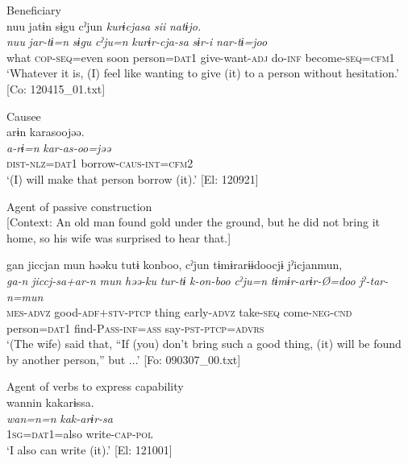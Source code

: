 \ea\label{ex:6-55}
\ea Beneficiary\\
{\TM}
\glll  nuu  jatɨn  sɨgu  cˀjun  \textit{kurɨcjasa}  \textit{sii}  \textit{natɨjo.}\\
\textit{nuu}  \textit{jar-tɨ=n}  \textit{sɨgu}  \textit{cˀju=n}  \textit{kurɨr-cja-sa}      \textit{sɨr-i}  \textit{nar-tɨ=joo}\\
what  \textsc{cop}-\textsc{seq}=even  soon  person=\textsc{dat}1  give-want-\textsc{adj}   do-\textsc{inf}  become-\textsc{seq}=\textsc{cfm}1\\
\glt ‘Whatever it is, (I) feel like wanting to give (it) to a person without hesitation.’ [Co: 120415\_01.txt]

\ex Causee\\
{\TM}
\glll  arɨn  karasoojəə.\\
\textit{a-rɨ=n}  \textit{kar-as-oo=jəə}\\
\textsc{dist}-\textsc{nlz}=\textsc{dat}1  borrow-\textsc{caus}-\textsc{int}=\textsc{cfm}2\\
\glt ‘(I) will make that person borrow (it).’ [El: 120921]

\ex Agent of passive construction\\{}
[Context: An old man found gold under the ground, but he did not bring it home, so his wife was surprised to hear that.]

{\TM}
\glll gan  jiccjan  mun  həəku  tutɨ   konboo,  cˀjun  tɨmɨrarɨɨdoocjɨ  jˀicjanmun,\\
      \textit{ga-n}  \textit{jiccj-sa+ar-n}  \textit{mun}  \textit{həə-ku}  \textit{tur-tɨ}  \textit{k-on-boo}  \textit{cˀju=n}  \textit{tɨmɨr-arɨr-Ø=doo}  \textit{jˀ-tar-n=mun}\\
      \textsc{mes}-\textsc{advz}  good-\textsc{adf}+\textsc{stv}-\textsc{ptcp}  thing  early-\textsc{advz}  take-\textsc{seq} come-\textsc{neg}-\textsc{cnd}  person=\textsc{dat}1  find-P\textsc{ass}-\textsc{inf}=\textsc{ass}  say-\textsc{pst}-\textsc{ptcp}=\textsc{advrs}\\
\glt ‘(The wife) said that, “If (you) don’t bring such a good thing, (it) will be found by another person,” but ...’ [Fo: 090307\_00.txt]

\ex Agent of verbs to express capability\\
{\TM}
\glll  wannin  kakarɨssa.\\
\textit{wan=n=n}  \textit{kak-arɨr-sa}\\
1\textsc{sg}=\textsc{dat}1=also  write-\textsc{cap}-\textsc{pol}\\
\glt ‘I also can write (it).’ [El: 121001]

